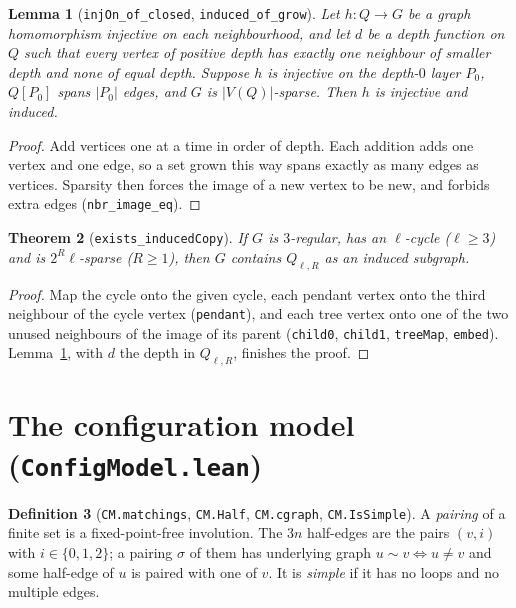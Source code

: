 \documentclass[11pt]{amsart}
\newcommand{\leanname}[1]{\texttt{\textcolor{black!75}{#1}}}
\newcommand{\lfile}[1]{\texttt{#1}}
\newcommand{\Q}{Q_{\ell,R}}
\theoremstyle{plain}
\newtheorem{theorem}{Theorem}[section]
\newtheorem{lemma}[theorem]{Lemma}
\theoremstyle{definition}
\newtheorem{definition}[theorem]{Definition}
\theoremstyle{remark}
\begin{document}
\begin{lemma}[\leanname{injOn\_of\_closed}, \leanname{induced\_of\_grow}]\label{lem:grow}
Let $h:Q\to G$ be a graph homomorphism injective on each neighbourhood, and let $d$ be a depth
function on $Q$ such that every vertex of positive depth has exactly one neighbour of smaller
depth and none of equal depth. Suppose $h$ is injective on the depth-$0$ layer $P_0$, $Q[P_0]$
spans $|P_0|$ edges, and $G$ is $|V(Q)|$-sparse. Then $h$ is injective and induced.
\end{lemma}
\begin{proof}
Add vertices one at a time in order of depth. Each addition adds one vertex and one edge, so a
set grown this way spans exactly as many edges as vertices. Sparsity then forces the image of a
new vertex to be new, and forbids extra edges (\leanname{nbr\_image\_eq}).
\end{proof}

\begin{theorem}[\leanname{exists\_inducedCopy}]\label{thm:ext}
If $G$ is $3$-regular, has an $\ell$-cycle ($\ell\ge3$) and is $2^R\ell$-sparse ($R\ge1$), then $G$
contains $\Q$ as an induced subgraph.
\end{theorem}
\begin{proof}
Map the cycle onto the given cycle, each pendant vertex onto the third neighbour of the cycle
vertex (\leanname{pendant}), and each tree vertex onto one of the two unused neighbours of the
image of its parent (\leanname{child0}, \leanname{child1}, \leanname{treeMap}, \leanname{embed}).
Lemma~\ref{lem:grow}, with $d$ the depth in $\Q$, finishes the proof.
\end{proof}

\section{The configuration model (\lfile{ConfigModel.lean})}

\begin{definition}[\leanname{CM.matchings}, \leanname{CM.Half}, \leanname{CM.cgraph}, \leanname{CM.IsSimple}]
A \emph{pairing} of a finite set is a fixed-point-free involution. The $3n$ half-edges are the
pairs $(v,i)$ with $i\in\{0,1,2\}$; a pairing $\sigma$ of them has underlying graph
$u\sim v\iff u\ne v$ and some half-edge of $u$ is paired with one of $v$. It is \emph{simple} if
it has no loops and no multiple edges.
\end{definition}
\end{document}
